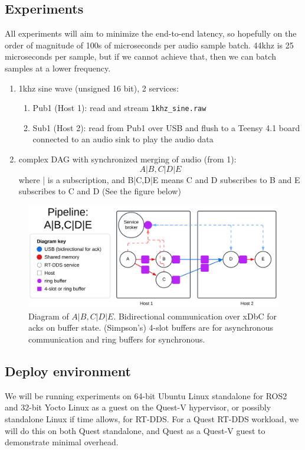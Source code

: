 \documentclass[11pt]{article}
\begin{document}
\subsection{Experiments}
\label{sec:org5d35b43}
All experiments will aim to minimize the end-to-end latency, so hopefully
on the order of magnitude of 100s of microseconds per audio sample batch.
44khz is 25 microseconds per sample, but if we cannot achieve that, then
we can batch samples at a lower frequency.
\begin{enumerate}
\item 1khz sine wave (unsigned 16 bit), 2 services:
\begin{enumerate}
\item Pub1 (Host 1): read and stream \texttt{1khz\_sine.raw}
\item Sub1 (Host 2): read from Pub1 over USB and flush to a Teensy 4.1 board
connected to an audio sink to play the audio data
\end{enumerate}
\item complex DAG with synchronized merging of audio (from 1):
$$A|B,C|D|E$$ where | is a subscription, and B|C,D|E means C and D subscribes to
B and E subscribes to C and D (See the figure below)
\end{enumerate}

\begin{figure}[htbp]
\centering
\includegraphics[width=.9\linewidth]{./pipeline.png}
\caption{\label{fig:org6461418}Diagram of \(A|B,C|D|E\). Bidirectional communication over xDbC for acks on buffer state. (Simpson's) 4-slot buffers are for asynchronous communication and ring buffers for synchronous.}
\end{figure}
\subsection{Deploy environment}
\label{sec:org71847aa}
We will be running experiments on 64-bit Ubuntu Linux standalone for ROS2 and
32-bit Yocto Linux as a guest on the Quest-V hypervisor, or possibly standalone
Linux if time allows, for RT-DDS. For a Quest RT-DDS workload, we will do this
on both Quest standalone, and Quest as a Quest-V guest to demonstrate minimal
overhead.
\end{document}
